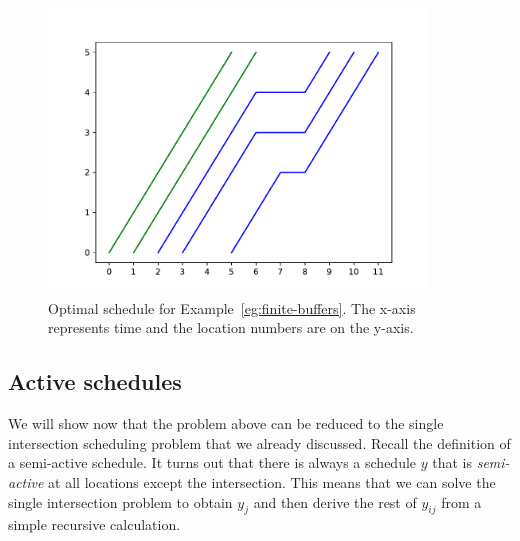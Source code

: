\documentclass{article}
\theoremstyle{definition}
\theoremstyle{plain}
\begin{document}
\begin{figure}
  \centering
  \includegraphics[width=0.9\textwidth]{figures/finite-buffer-schedule.pdf}
  \caption{Optimal schedule for Example~\ref{eg:finite-buffers}. The x-axis
    represents time and the location numbers are on the y-axis.}
  \label{fig:finite-buffer-example-schedule}
\end{figure}


\subsection{Active schedules}

We will show now that the problem above can be reduced to the single
intersection scheduling problem that we already discussed. Recall the definition
of a semi-active schedule. It turns out that there is always a schedule $y$ that
is \textit{semi-active} at all locations except the intersection. This means
that we can solve the single intersection problem to obtain $y_{j}$ and then
derive the rest of $y_{ij}$ from a simple recursive calculation.
\end{document}
